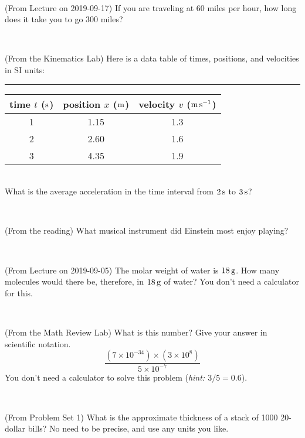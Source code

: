 \documentclass[12pt, letterpaper]{article}
\begin{document}
\vfill ~

\begin{problem} (From Lecture on 2019-09-17)
If you are traveling at 60 miles per hour, how long does
it take you to go 300 miles?
\end{problem}


\vfill ~

\begin{problem} (From the Kinematics Lab)
Here is a data table of times, positions, and velocities in SI units:\\
\rule{1.0in}{0pt}\begin{tabular}{c|c|c}
time $t$ ($\mathrm{s}$) & position $x$ ($\mathrm{m}$) & velocity $v$ ($\mathrm{m}\,\mathrm{s}^{-1}$) \\
\hline
1 & 1.15 & 1.3 \\
2 & 2.60 & 1.6 \\
3 & 4.35 & 1.9 \\
\hline
\end{tabular}\\
What is the average acceleration in the time interval from $2\,\mathrm{s}$ to $3\,\mathrm{s}$?
\end{problem}


\vfill ~

\begin{problem} (From the reading)
What musical instrument did Einstein most enjoy playing?
\end{problem}


\vfill ~


\clearpage


\begin{problem} (From Lecture on 2019-09-05)
The molar weight of water is $18\,\mathrm{g}$. How many molecules would there
be, therefore, in $18\,\mathrm{g}$ of water? You don't need a calculator for
this.
\end{problem}


\vfill ~

\begin{problem} (From the Math Review Lab)
What is this number? Give your answer in scientific notation.
$$
\frac{(7\times10^{-34})\times(3\times10^8)}{5\times10^{-7}}
$$
You don't need a calculator to solve this problem (\textit{hint: $3/5=0.6$}).
\end{problem}


\vfill ~

\begin{problem} (From Problem Set 1)
What is the approximate thickness of a stack of 1000 20-dollar bills?
No need to be precise, and use any units you like.
\end{problem}
\end{document}
